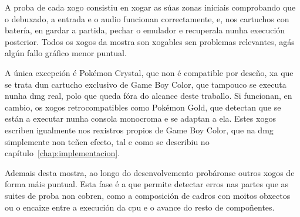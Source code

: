 A proba de cada xogo consistiu en xogar as súas zonas iniciais comprobando que o debuxado, a entrada e o audio funcionan correctamente,
e, nos cartuchos con batería, en gardar a partida, pechar o emulador e recuperala nunha execución posterior.
Todos os xogos da mostra son xogables sen problemas relevantes, agás algún fallo gráfico menor puntual.

A única excepción é Pokémon Crystal, que non é compatible por deseño,
xa que se trata dun cartucho exclusivo de Game Boy Color, que tampouco se executa nunha \acrshort{dmg} real,
polo que queda fóra do alcance deste traballo.
Si funcionan, en cambio, os xogos retrocompatibles como Pokémon Gold,
que detectan que se están a executar nunha consola monocroma e se adaptan a ela.
Estes xogos escriben igualmente nos rexistros propios de Game Boy Color,
que na \acrshort{dmg} simplemente non teñen efecto, tal e como se describiu no capítulo~\ref{chap:implementacion}.

Ademais desta mostra, ao longo do desenvolvemento probáronse outros xogos de forma máis puntual.
Esta fase é a que permite detectar erros nas partes que as suites de proba non cobren,
como a composición de cadros con moitos obxectos ou o encaixe entre a execución da \acrshort{cpu} e o avance do resto de compoñentes.

